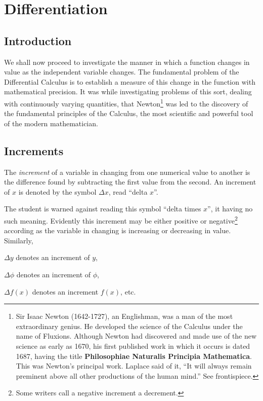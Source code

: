 
\chapter{Differentiation}

 
\section{Introduction}

We shall now proceed to investigate the manner in which 
a function changes in value as the independent variable 
changes. The fundamental problem of the Differential Calculus 
is to establish a measure of this change in the function with 
mathematical precision. It was while investigating problems of 
this sort, dealing with continuously varying quantities, that 
Newton\footnote{Sir Isaac Newton (1642-1727), an Englishman, 
was a man of the most extraordinary genius. He developed the 
science of the Calculus under the name of Fluxions. Although 
Newton had discovered and made use of the new science as 
early as 1670, his first published work in which it occurs 
is dated 1687, having the title {\bf Philosophiae Naturalis 
Principia Mathematica}. This was Newton's principal work. 
Laplace said of it, ``It will always remain preminent above 
all other productions of the human mind.'' See frontispiece.}
was led to the discovery of the fundamental principles 
of the Calculus, the most scientific and powerful tool of the 
modern mathematician.

\section{Increments}
The {\it increment} of a variable in changing from one 
numerical value to another is the difference found by 
subtracting the first value from the second. An increment of $x$ 
is denoted by the symbol $\Delta x$, read ``delta $x$''.

The student is warned against reading this symbol 
``delta times $x$'', it having no such meaning. Evidently 
this increment may be either positive or negative\footnote{Some 
writers call a negative increment a decrement.}
according as the variable in changing is increasing or 
decreasing in value. Similarly,

\qquad     $\Delta y$ 	denotes an increment of $y$,

\qquad    $\Delta \phi$ 	denotes an increment of $\phi$,

\qquad  $\Delta f(x)$ 	denotes an increment $f(x)$, etc.

